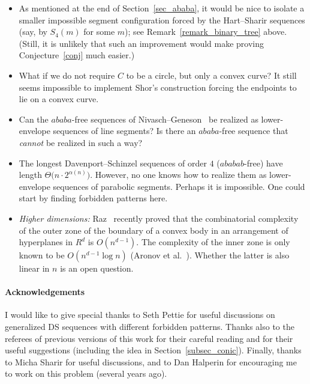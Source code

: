 \documentclass[11pt]{article}
\theoremstyle{definition}
\theoremstyle{remark}
\begin{document}
\begin{itemize}
\item As mentioned at the end of Section~\ref{sec_ababa}, it would be nice to isolate a smaller impossible segment configuration forced by the Hart--Sharir sequences (say, by $S_4(m)$ for some $m$); see Remark~\ref{remark_binary_tree} above. (Still, it is unlikely that such an improvement would make proving Conjecture~\ref{conj} much easier.)

\item What if we do not require $C$ to be a circle, but only a convex curve? It still seems impossible to implement Shor's construction forcing the endpoints to lie on a convex curve.

\item  Can the $ababa$-free sequences of Nivasch--Geneson~\cite{geneson,yo_DS} be realized as lower-envelope sequences of line segments? Is there an $ababa$-free sequence that \emph{cannot} be realized in such a way?

\item The longest Davenport--Schinzel sequences of order $4$ ($ababab$-free) have length $\Theta\bigl(n\cdot 2^{\alpha(n)}\bigr)$. However, no one knows how to realize them as lower-envelope sequences of parabolic segments. Perhaps it is impossible. One could start by finding forbidden patterns here.

\item \emph{Higher dimensions:} Raz~\cite{raz} recently proved that the combinatorial complexity of the outer zone of the boundary of a convex body in an arrangement of hyperplanes in $R^d$ is $O(n^{d-1})$. The complexity of the inner zone is only known to be $O(n^{d-1}\log n)$ (Aronov et al.~\cite{APS}). Whether the latter is also linear in $n$ is an open question.
\end{itemize}

\paragraph{Acknowledgements} I would like to give special thanks to Seth Pettie for useful discussions on generalized DS sequences with different forbidden patterns. Thanks also to the referees of previous versions of this work for their careful reading and for their useful suggestions (including the idea in Section~\ref{subsec_conic}). Finally, thanks to Micha Sharir for useful discussions, and to Dan Halperin for encouraging me to work on this problem (several years ago).
\end{document}
